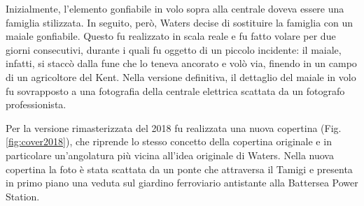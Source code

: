 \documentclass[class=book, crop=false, oneside, 12pt]{standalone}
\begin{document}
    Inizialmente, l'elemento gonfiabile in volo sopra alla centrale doveva essere una famiglia stilizzata. In seguito, però, Waters decise di sostituire la famiglia con un maiale gonfiabile. Questo fu realizzato in scala reale e fu fatto volare per due giorni consecutivi, durante i quali fu oggetto di un piccolo incidente: il maiale, infatti, si staccò dalla fune che lo teneva ancorato e volò via, finendo in un campo di un agricoltore del Kent. Nella versione definitiva, il dettaglio del maiale in volo fu sovrapposto a una fotografia della centrale elettrica scattata da un fotografo professionista.
    
    Per la versione rimasterizzata del 2018 fu realizzata una nuova copertina (Fig.\ref{fig:cover2018}), che riprende lo stesso concetto della copertina originale e in particolare un'angolatura più vicina all'idea originale di Waters. Nella nuova copertina la foto è stata scattata da un ponte che attraversa il Tamigi e presenta in primo piano una veduta sul giardino ferroviario antistante alla Battersea Power Station.
\end{document}
